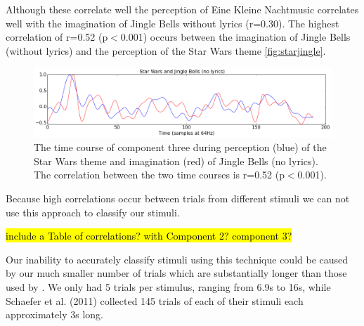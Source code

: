 Although these correlate well the perception of Eine Kleine Nachtmusic correlates well with the imagination of Jingle Bells without lyrics (r=0.30). 
The highest correlation of r=0.52 (p$<$0.001) occurs between the imagination of Jingle Bells (without lyrics) and the perception of the Star Wars theme \autoref{fig:starjingle}.
\begin{figure}[htbp]
  \centerline{\includegraphics[scale=0.4]{Figures/StarJingle}}
  \caption{The time course of component three during perception (blue) of the Star Wars theme and imagination (red) of Jingle Bells (no lyrics). The correlation between the two time courses is r=0.52 (p$<$0.001).}
  \label{fig:starjingle}
\end{figure}
Because high correlations occur between trials from different stimuli we can not use this approach to classify our stimuli.

\hl{include a Table of correlations? with Component 2? component 3?}

Our inability to accurately classify stimuli using this technique could be caused by our much smaller number of trials which are substantially longer than those used by \cite{schaefer_name_2011}. 
We only had 5 trials per stimulus, ranging from 6.9s to 16s, while Schaefer et al. (2011) collected 145 trials of each of their stimuli each approximately 3s long.